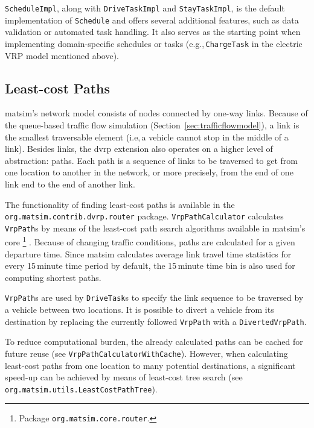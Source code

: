\lstinline$ScheduleImpl$, along with \lstinline$DriveTaskImpl$ and \lstinline$StayTaskImpl$, is the default implementation of \lstinline$Schedule$ and offers several additional features, such as data validation or automated task handling. It also serves as the starting point when implementing domain-specific schedules or tasks (e.g.,\,\lstinline$ChargeTask$ in the electric VRP model mentioned above).

\subsection{Least-cost Paths}
\label{sec:VRP-router}

\gls{matsim}'s network model consists of nodes connected by one-way links. Because of the queue-based traffic flow simulation (Section~\ref{sec:trafficflowmodel}), a link is the smallest traversable element (i.e,\,a vehicle cannot stop in the middle of a link). Besides links, the \gls{dvrp} extension also operates on a higher level of abstraction: paths. Each path is a sequence of links to be traversed to get from one location to another in the network, or more precisely, from the end of one link end to the end of another link. 

The functionality of finding least-cost paths is available in the \lstinline$org.matsim.contrib.dvrp.router$ package. \lstinline$VrpPathCalculator$ calculates \lstinline$VrpPath$s by means of the least-cost path search algorithms available in \gls{matsim}'s core%
\footnote{
Package \lstinline$org.matsim.core.router$.
}
\citep{JacobMaratheEtAl1999computationalstudyof,LefebvreBalmer2007Fastshortestpath}. Because of changing traffic conditions, paths are calculated for a given departure time. Since \gls{matsim} calculates average link travel time statistics for every 15\,minute time period by default, the 15\,minute time bin is also used for computing shortest paths.

\lstinline$VrpPath$s are used by \lstinline$DriveTask$s to specify the link sequence to be traversed by a vehicle between two locations. It is possible to divert a vehicle from its destination by replacing the currently followed \lstinline$VrpPath$ with a \lstinline$DivertedVrpPath$.

To reduce computational burden, the already calculated paths can be cached for future reuse (see \lstinline$VrpPathCalculatorWithCache$). However, when calculating least-cost paths from one location to many potential destinations, a significant speed-up can be achieved by means of least-cost tree search (see \lstinline$org.matsim.utils.LeastCostPathTree$).

